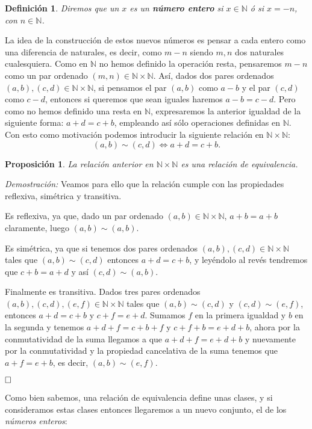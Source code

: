 \documentclass[12pt]{article}
\newtheorem{proposition}[theorem]{Proposición}
\newtheorem{definition}[theorem]{Definición}
\begin{document}
\begin{definition}Diremos que un $x$ es un \textbf{número entero} si $x \in \mathbb{N}$ ó si $x = -n$, con $n \in \mathbb{N}$.
\end{definition}

La idea de la construcción de estos nuevos números es pensar a cada entero como una diferencia de naturales, es decir, como $m-n$ siendo $m,n$ dos naturales cualesquiera. Como en $\mathbb{N}$ no hemos definido la operación resta, pensaremos $m-n$ como un par ordenado $(m,n) \in \mathbb{N} \times \mathbb{N}$. Así, dados dos pares ordenados $(a,b),(c,d) \in \mathbb{N} \times \mathbb{N}$, si pensamos el par $(a,b)$ como $a-b$ y el par $(c,d)$ como $c-d$, entonces si queremos que sean iguales haremos $a-b=c-d$. Pero como no hemos definido una resta en $\mathbb{N}$, expresaremos la anterior igualdad de la siguiente forma: $a+d = c+b$, empleando así sólo operaciones definidas en $\mathbb{N}$. Con esto como motivación podemos introducir la siguiente relación en $\mathbb{N} \times \mathbb{N}$: $$(a,b) \sim (c,d) \Leftrightarrow a+d = c+b.$$

\begin{proposition}La relación anterior en $\mathbb{N} \times \mathbb{N}$ es una relación de equivalencia.
\end{proposition}
\emph{Demostración: }Veamos para ello que la relación cumple con las propiedades reflexiva, simétrica y transitiva.

Es reflexiva, ya que, dado un par ordenado $(a,b) \in \mathbb{N} \times \mathbb{N}$, $a+b = a+b$ claramente, luego $(a,b) \sim (a,b)$.

Es simétrica, ya que si tenemos dos pares ordenados $(a,b), (c,d) \in \mathbb{N} \times \mathbb{N}$ tales que $(a,b) \sim (c,d)$ entonces $a+d = c+b$, y leyéndolo al revés tendremos que $c+b = a +d$ y así $(c,d) \sim (a,b)$.

Finalmente es transitiva. Dados tres pares ordenados $(a,b),(c,d),(e,f) \in \mathbb{N} \times \mathbb{N}$ tales que $(a,b) \sim (c,d) $ y $(c,d) \sim (e,f)$, entonces $a+d = c+b$ y $c+f = e+d$. Sumamos $f$ en la primera igualdad y $b$ en la segunda y tenemos $a+d+f = c+b+f$ y $c+f+b = e+d+b$, ahora por la conmutatividad de la suma llegamos a que $a+d+f = e+d+b$ y nuevamente por la conmutatividad y la propiedad cancelativa de la suma tenemos que $a+f = e+b$, es decir, $(a,b) \sim (e,f)$.

$\hfill \square$

Como bien sabemos, una relación de equivalencia define unas clases, y si consideramos estas clases entonces llegaremos a un nuevo conjunto, el de los \textit{números enteros}:
\end{document}
